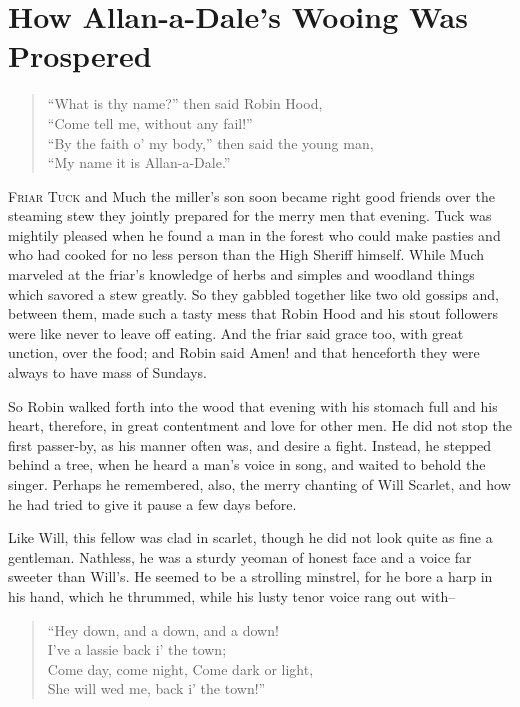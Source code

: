 \chapter{How Allan-a-Dale's Wooing Was Prospered}

\begin{quote}
``What is thy name?'' then said Robin Hood,\\
``Come tell me, without any fail!''\\
``By the faith o' my body,'' then said the young man,\\
``My name it is Allan-a-Dale.''
\end{quote}

\lettrine{F}{riar Tuck} and Much the miller's son soon became right good
friends over the steaming stew they jointly prepared for the merry men
that evening. Tuck was mightily pleased when he found a man in the forest
who could make pasties and who had cooked for no less person than the
High Sheriff himself. While Much marveled at the friar's knowledge of
herbs and simples and woodland things which savored a stew greatly. So
they gabbled together like two old gossips and, between them, made such a
tasty mess that Robin Hood and his stout followers were like never to
leave off eating. And the friar said grace too, with great unction, over
the food; and Robin said Amen! and that henceforth they were always to
have mass of Sundays.

So Robin walked forth into the wood that evening with his stomach full
and his heart, therefore, in great contentment and love for other men.
He did not stop the first passer-by, as his manner often was, and desire
a fight. Instead, he stepped behind a tree, when he heard a man's voice
in song, and waited to behold the singer. Perhaps he remembered, also,
the merry chanting of Will Scarlet, and how he had tried to give it
pause a few days before.

Like Will, this fellow was clad in scarlet, though he did not look quite
as fine a gentleman. Nathless, he was a sturdy yeoman of honest face and
a voice far sweeter than Will's. He seemed to be a strolling minstrel,
for he bore a harp in his hand, which he thrummed, while his lusty tenor
voice rang out with--

\begin{quote}
``Hey down, and a down, and a down!\\
I've a lassie back i' the town;\\
Come day, come night, Come dark or light,\\
She will wed me, back i' the town!''
\end{quote}

